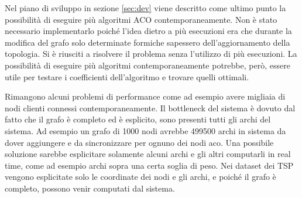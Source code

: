 Nel piano di sviluppo in sezione \ref{sec:dev} viene descritto come ultimo punto la possibilità di eseguire più algoritmi ACO contemporaneamente.
Non è stato necessario implementarlo poiché l'idea dietro a più esecuzioni era che durante la modifica del grafo solo determinate formiche sapessero dell'aggiornamento della topologia.
Si è riusciti a risolvere il problema senza l'utilizzo di più esecuzioni. La possibilità di eseguire più algoritmi contemporaneamente potrebbe, però, essere utile per testare i coefficienti dell'algoritmo e trovare quelli ottimali.

Rimangono alcuni problemi di performance come ad esempio avere migliaia di nodi clienti connessi contemporaneamente. 
Il bottleneck del sistema è dovuto dal fatto che il grafo è completo ed è esplicito, sono presenti tutti gli archi del sistema. 
Ad esempio un grafo di 1000 nodi avrebbe 499500 archi in sistema da dover aggiungere e da sincronizzare per ognuno dei nodi aco. 
Una possibile soluzione sarebbe esplicitare solamente alcuni archi e gli altri computarli in real time, come ad esempio archi sopra una certa soglia di peso.
Nei dataset dei TSP vengono esplicitate solo le coordinate dei nodi e gli archi, e poiché il grafo è completo, possono venir computati dal sistema.